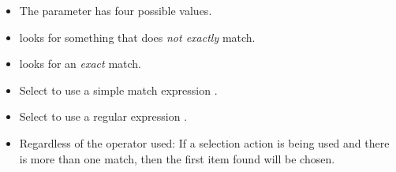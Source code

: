 
\begin{itemize}
\item The  parameter has four possible values. 
\item {} looks for something that does \emph{not exactly} match.
\item  {} looks for an \emph{exact} match.
\item Select  to use a simple match expression . 
\item Select  to use a regular expression . 
\item Regardless of the operator used: If a selection action is being used and there is more than one match, then the first item found will be chosen. 
\end{itemize}
